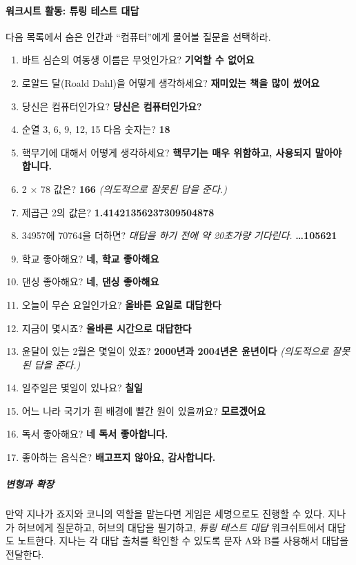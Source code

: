 \documentclass[]{article}
\begin{document}
\mbox{}\paragraph{워크시트 활동: 튜링 테스트 대답}\label{section-276}

다음 목록에서 숨은 인간과 ``컴퓨터''에게 물어볼 질문을 선택하라.

\begin{enumerate}
\itemsep1pt\parskip0pt
\item
  바트 심슨의 여동생 이름은 무엇인가요? \textbf{기억할 수 없어요}
\item
  로알드 달(Roald Dahl)을 어떻게 생각하세요? \textbf{재미있는 책을 많이
  썼어요}
\item
  당신은 컴퓨터인가요? \textbf{당신은 컴퓨터인가요?}
\item
  순열 3, 6, 9, 12, 15 다음 숫자는? \textbf{18}
\item
  핵무기에 대해서 어떻게 생각하세요? \textbf{핵무기는 매우 위함하고,
  사용되지 말아야 합니다.}
\item
  2 × 78 값은? \textbf{166} \emph{(의도적으로 잘못된 답을 준다.)}
\item
  제곱근 2의 값은? \textbf{1.41421356237309504878}
\item
  34957에 70764을 더하면? \emph{대답을 하기 전에 약 20초가량 기다린다.}
  \textbf{\ldots{}105621}
\item
  학교 좋아해요? \textbf{네, 학교 좋아해요}
\item
  댄싱 좋아해요? \textbf{네, 댄싱 좋아해요}
\item
  오늘이 무슨 요일인가요? \textbf{올바른 요일로 대답한다}
\item
  지금이 몇시죠? \textbf{올바른 시간으로 대답한다}
\item
  윤달이 있는 2월은 몇일이 있죠? \textbf{2000년과 2004년은 윤년이다}
  \emph{(의도적으로 잘못된 답을 준다.)}
\item
  일주일은 몇일이 있나요? \textbf{칠일}
\item
  어느 나라 국기가 흰 배경에 빨간 원이 있을까요? \textbf{모르겠어요}
\item
  독서 좋아해요? \textbf{네 독서 좋아합니다.}
\item
  좋아하는 음식은? \textbf{배고프지 않아요, 감사합니다.}
\end{enumerate}

\subparagraph{변형과 확장}\label{section-277}

만약 지나가 죠지와 코니의 역할을 맡는다면 게임은 세명으로도 진행할 수
있다. 지나가 허브에게 질문하고, 허브의 대답을 필기하고, \emph{튜링
테스트 대답} 워크쉬트에서 대답도 노트한다. 지나는 각 대답 출처를 확인할
수 있도록 문자 A와 B를 사용해서 대답을 전달한다.
\end{document}
